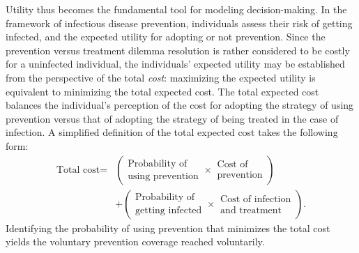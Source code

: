 Utility thus becomes the fundamental tool for modeling decision-making. In the framework of infectious disease prevention, individuals assess their risk of getting infected, and the expected utility for adopting or not prevention. Since the prevention versus treatment dilemma resolution is rather considered to be costly for a uninfected individual, the individuals' expected utility may be established from the perspective of the total {\it cost}: maximizing the expected utility is equivalent to minimizing the total expected cost. The total expected cost balances the individual's perception of the cost for adopting the strategy of using prevention versus that of adopting the strategy of being treated in the case of infection. A simplified definition of the total expected cost takes the following form:
\begin{align*}
	\text{Total cost} = & \left( 
		\begin{array}{c}
		\text{Probability of}\\
		\text{using prevention}
		\end{array}
	 	\times 
		\begin{array}{c}
		\text{Cost of}\\
		\text{prevention}
		\end{array}
		\right)\\
	& + \left( 
		\begin{array}{c}
		\text{Probability of}\\
		\text{getting infected}
		\end{array}
	 	\times 
		\begin{array}{c}
		\text{Cost of infection}\\
		\text{and treatment}
		\end{array}
		\right).
\end{align*}
%
Identifying the probability of using prevention that minimizes the total cost yields the voluntary prevention coverage reached voluntarily.

